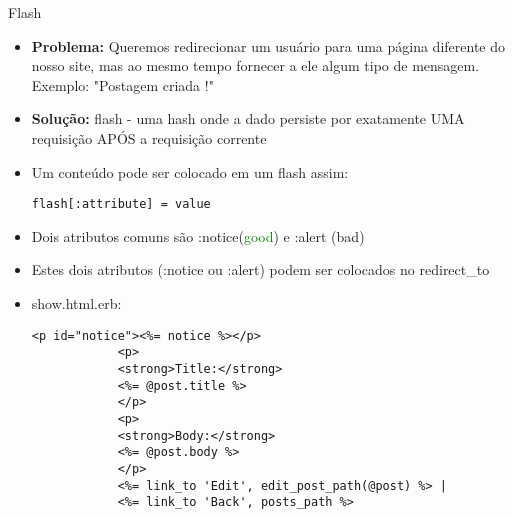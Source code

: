 \begin{frame}{Flash}
	\begin{itemize}
		\item \textbf{\alert{Problema:}} Queremos \alert{redirecionar} um usuário para uma página 
			diferente do nosso site, mas ao mesmo tempo \alert{fornecer} a ele algum tipo de mensagem.
			Exemplo: "Postagem criada !" 
		\item \textbf{\alert{Solução:}} flash - uma \alert{hash} onde a dado persiste por exatamente 
			\alert{UMA requisição APÓS} a requisição corrente
		\item Um conteúdo pode ser colocado em um flash assim:
		\begin{lstlisting}[style=RubyInputStyle, caption=controllers/posts\_controller.rb] 
			flash[:attribute] = value
		\end{lstlisting}		
		\item Dois atributos \alert{comuns} são \alert{:notice}(\textcolor{Green}{good}) e \alert{:alert}
			(\alert{bad})
		\item Estes dois atributos (:notice ou :alert) podem ser colocados no redirect\_to
		\item \alert{show.html.erb}:
		\begin{lstlisting}[style=RubyInputStyle, caption=views/posts/show.html.erb]
			<p id="notice"><%= notice %></p>
			<p>
			<strong>Title:</strong>
			<%= @post.title %>
			</p>
			<p>
			<strong>Body:</strong>
			<%= @post.body %>
			</p>
			<%= link_to 'Edit', edit_post_path(@post) %> |
			<%= link_to 'Back', posts_path %>	
		\end{lstlisting}		
	\end{itemize}	
\end{frame}